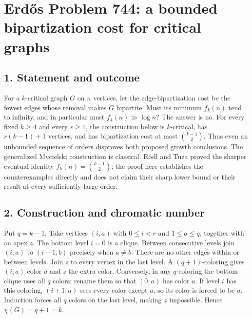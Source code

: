 \section*{Erd\H{o}s Problem 744: a bounded bipartization cost for critical graphs}
\subsection*{1. Statement and outcome}
For a $k$-critical graph $G$ on $n$ vertices, let the edge-bipartization cost be the fewest edges whose removal makes $G$ bipartite. Must its minimum $f_k(n)$ tend to infinity, and in particular must $f_4(n)\gg\log n$?
The answer is no. For every fixed $k\ge4$ and every $r\ge1$, the construction below is $k$-critical, has $r(k-1)+1$ vertices, and has bipartization cost at most $\binom{k-1}{2}$. Thus even an unbounded sequence of orders disproves both proposed growth conclusions.
The generalized Mycielski construction is classical. R\"odl and Tuza proved the sharper eventual identity $f_k(n)=\binom{k-1}{2}$; the proof here establishes the counterexamples directly and does not claim their sharp lower bound or their result at every sufficiently large order.
\subsection*{2. Construction and chromatic number}
Put $q=k-1$. Take vertices $(i,a)$ with $0\le i<r$ and $1\le a\le q$, together with an apex $z$. The bottom level $i=0$ is a clique. Between consecutive levels join $(i,a)$ to $(i+1,b)$ precisely when $a\ne b$. There are no other edges within or between levels. Join $z$ to every vertex in the last level.
A $(q+1)$-coloring gives $(i,a)$ color $a$ and $z$ the extra color. Conversely, in any $q$-coloring the bottom clique uses all $q$ colors; rename them so that $(0,a)$ has color $a$. If level $i$ has this coloring, $(i+1,a)$ sees every color except $a$, so its color is forced to be $a$. Induction forces all $q$ colors on the last level, making $z$ impossible. Hence $\chi(G)=q+1=k$.

